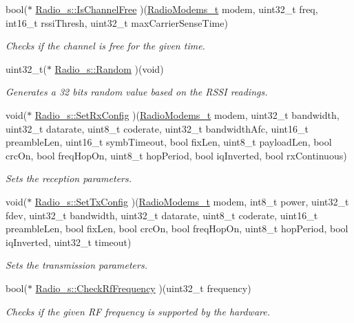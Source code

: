 \begin{DoxyCompactItemize}
bool($\ast$ \hyperlink{group__LORA_ga9e6632b46872513fe063489eb22f9663}{Radio\+\_\+s\+::\+Is\+Channel\+Free} )(\hyperlink{group__LORA_ga992ef7a5b7f52975ba7bd8dd97740057}{Radio\+Modems\+\_\+t} modem, uint32\+\_\+t freq, int16\+\_\+t rssi\+Thresh, uint32\+\_\+t max\+Carrier\+Sense\+Time)
\begin{DoxyCompactList}\small\item\em Checks if the channel is free for the given time. \end{DoxyCompactList}\item 
uint32\+\_\+t($\ast$ \hyperlink{group__LORA_gaf39c7ced02721092f0f780f6632a81fd}{Radio\+\_\+s\+::\+Random} )(void)
\begin{DoxyCompactList}\small\item\em Generates a 32 bits random value based on the R\+S\+SI readings. \end{DoxyCompactList}\item 
void($\ast$ \hyperlink{group__LORA_gadd564d2a79027afbc6f0f8f3011fe93b}{Radio\+\_\+s\+::\+Set\+Rx\+Config} )(\hyperlink{group__LORA_ga992ef7a5b7f52975ba7bd8dd97740057}{Radio\+Modems\+\_\+t} modem, uint32\+\_\+t bandwidth, uint32\+\_\+t datarate, uint8\+\_\+t coderate, uint32\+\_\+t bandwidth\+Afc, uint16\+\_\+t preamble\+Len, uint16\+\_\+t symb\+Timeout, bool fix\+Len, uint8\+\_\+t payload\+Len, bool crc\+On, bool freq\+Hop\+On, uint8\+\_\+t hop\+Period, bool iq\+Inverted, bool rx\+Continuous)
\begin{DoxyCompactList}\small\item\em Sets the reception parameters. \end{DoxyCompactList}\item 
void($\ast$ \hyperlink{group__LORA_gad4177124b5db6b2b1f07ba16e631bbdb}{Radio\+\_\+s\+::\+Set\+Tx\+Config} )(\hyperlink{group__LORA_ga992ef7a5b7f52975ba7bd8dd97740057}{Radio\+Modems\+\_\+t} modem, int8\+\_\+t power, uint32\+\_\+t fdev, uint32\+\_\+t bandwidth, uint32\+\_\+t datarate, uint8\+\_\+t coderate, uint16\+\_\+t preamble\+Len, bool fix\+Len, bool crc\+On, bool freq\+Hop\+On, uint8\+\_\+t hop\+Period, bool iq\+Inverted, uint32\+\_\+t timeout)
\begin{DoxyCompactList}\small\item\em Sets the transmission parameters. \end{DoxyCompactList}\item 
bool($\ast$ \hyperlink{group__LORA_gad26df1cecc02c5d50f07ff062962f501}{Radio\+\_\+s\+::\+Check\+Rf\+Frequency} )(uint32\+\_\+t frequency)
\begin{DoxyCompactList}\small\item\em Checks if the given RF frequency is supported by the hardware. \end{DoxyCompactList}\item 

\end{DoxyCompactItemize}
